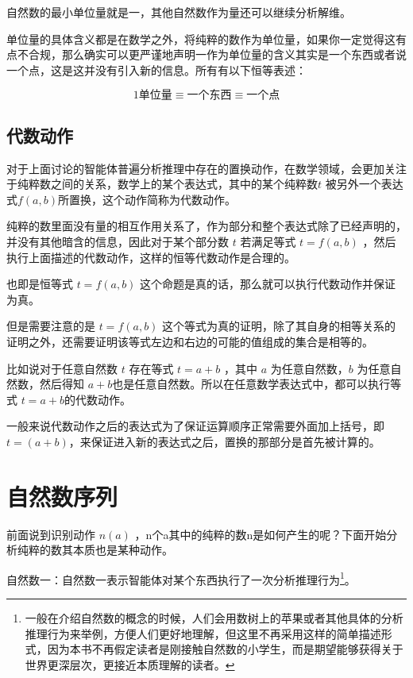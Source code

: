 \documentclass[12pt,oneside]{book}
\begin{document}
自然数的最小单位量就是一，其他自然数作为量还可以继续分析解维。

单位量的具体含义都是在数学之外，将纯粹的数作为单位量，如果你一定觉得这有点不合规，那么确实可以更严谨地声明一作为单位量的含义其实是一个东西或者说一个点，这是这并没有引入新的信息。所有有以下恒等表述：

\begin{equation}
\label{eq:1}
1\text{单位量} \equiv \text{一个东西} \equiv \text{一个点}
\end{equation}


\subsection{代数动作}
对于上面讨论的智能体普遍分析推理中存在的置换动作，在数学领域，会更加关注于纯粹数之间的关系，数学上的某个表达式，其中的某个纯粹数$t$ 被另外一个表达式$f(a,b)$所置换，这个动作简称为代数动作。

纯粹的数里面没有量的相互作用关系了，作为部分和整个表达式除了已经声明的，并没有其他暗含的信息，因此对于某个部分数 $t$ 若满足等式 $t=f(a,b)$ ，然后执行上面描述的代数动作，这样的恒等代数动作是合理的。

也即是恒等式 $t=f(a,b)$ 这个命题是真的话，那么就可以执行代数动作并保证为真。

但是需要注意的是 $t=f(a,b)$ 这个等式为真的证明，除了其自身的相等关系的证明之外，还需要证明该等式左边和右边的可能的值组成的集合是相等的。

比如说对于任意自然数 $t$ 存在等式 $t=a+b$ ，其中 $a$ 为任意自然数，$b$ 为任意自然数，然后得知 $a+b$也是任意自然数。所以在任意数学表达式中，都可以执行等式 $t=a+b$的代数动作。

一般来说代数动作之后的表达式为了保证运算顺序正常需要外面加上括号，即 $t = (a+b)$，来保证进入新的表达式之后，置换的那部分是首先被计算的。



\section{自然数序列}
前面说到识别动作 $n(a)$ ，n个a其中的纯粹的数n是如何产生的呢？下面开始分析纯粹的数其本质也是某种动作。

自然数一：自然数一表示智能体对某个东西执行了一次分析推理行为\footnote{一般在介绍自然数的概念的时候，人们会用数树上的苹果或者其他具体的分析推理行为来举例，方便人们更好地理解，但这里不再采用这样的简单描述形式，因为本书不再假定读者是刚接触自然数的小学生，而是期望能够获得关于世界更深层次，更接近本质理解的读者。}。
\end{document}
